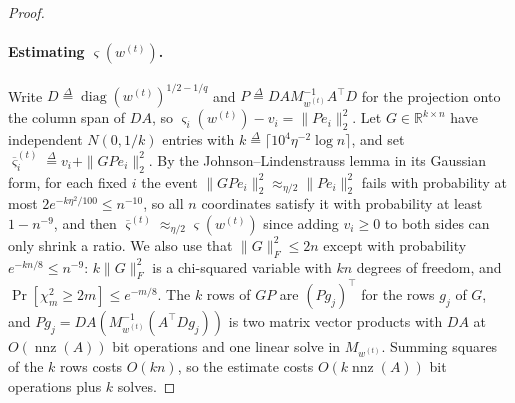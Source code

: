 \documentclass[11pt]{article}
\newcommand{\R}{\mathbb R}
\newcommand{\diag}{\operatorname{diag}}
\newcommand{\nnz}{\operatorname{nnz}}
\newcommand{\defeq}{\stackrel{\Delta}{=}}
\begin{document}
\begin{proof}
\paragraph{Estimating $\varsigma(w^{(t)})$.}
Write $D \defeq \diag(w^{(t)})^{1/2 - 1/q}$ and
$P \defeq D A M_{w^{(t)}}^{-1} A^{\top} D$ for the projection onto the column
span of $D A$, so
$\varsigma_i(w^{(t)}) - v_i = \|P e_i\|_2^{2}$.
Let $G \in \R^{k \times n}$ have independent
$N(0, 1/k)$ entries with
$k \defeq \lceil 10^{4} \eta^{-2} \log n \rceil$, and set
$\overline{\varsigma}^{(t)}_i \defeq v_i + \|G P e_i\|_2^{2}$.
By the Johnson--Lindenstrauss lemma in its Gaussian form, for each fixed $i$ the
event $\|G P e_i\|_2^{2} \approx_{\eta / 2} \|P e_i\|_2^{2}$ fails with
probability at most $2 e^{-k \eta^{2} / 100} \le n^{-10}$, so all
$n$ coordinates satisfy it with probability at least
$1 - n^{-9}$, and then
$\overline{\varsigma}^{(t)} \approx_{\eta / 2} \varsigma(w^{(t)})$ since adding
$v_i \ge 0$ to both sides can only shrink a ratio.
We also use that $\|G\|_F^{2} \le 2 n$ except with probability
$e^{-k n / 8} \le n^{-9}$:
$k \|G\|_F^{2}$ is a chi-squared variable with
$k n$ degrees of freedom, and
$\Pr[\chi^{2}_{m} \ge 2 m] \le e^{-m / 8}$.
The $k$ rows of
$G P$ are
$(P g_j)^{\top}$ for the rows
$g_j$ of
$G$, and
$P g_j = D A \left( M_{w^{(t)}}^{-1} \left( A^{\top} D g_j \right) \right)$ is
two matrix vector products with $D A$ at
$O(\nnz(A))$ bit operations and one linear solve in
$M_{w^{(t)}}$.
Summing squares of the $k$ rows costs
$O(k n)$, so the estimate costs
$O(k \nnz(A))$ bit operations plus
$k$ solves.


\end{proof}
\end{document}

